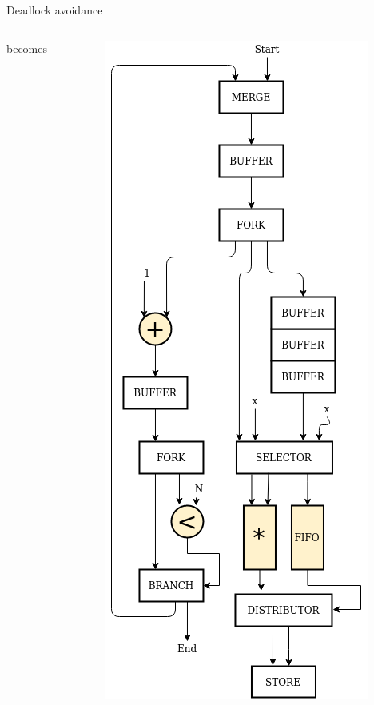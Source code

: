 \documentclass{beamer}
\begin{document}
\begin{frame}{Deadlock avoidance}
\begin{columns}[T]
\begin{column}{0.1\textwidth}
    \begin{center}
        becomes
    \end{center}
    \end{column}
    \begin{column}{0.25\textwidth}
      \includegraphics[scale=0.25]{blocking_shared.png}
    \end{column}
  \end{columns}
\end{frame}
\end{document}
